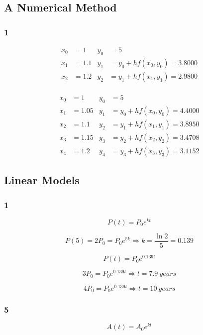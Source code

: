 \documentclass{article}
\begin{document}
\subsection{A Numerical Method}

\subsubsection{1}

\begin{align*}
  x_0 & = 1   & y_0 & = 5                            \\
  x_1 & = 1.1 & y_1 & = y_0 + h f(x_0, y_0) = 3.8000 \\
  x_2 & = 1.2 & y_2 & = y_1 + h f(x_1, y_1) = 2.9800 \\
\end{align*}

\begin{align*}
  x_0 & = 1    & y_0 & = 5                            \\
  x_1 & = 1.05 & y_1 & = y_0 + h f(x_0, y_0) = 4.4000 \\
  x_2 & = 1.1  & y_2 & = y_1 + h f(x_1, y_1) = 3.8950 \\
  x_3 & = 1.15 & y_3 & = y_2 + h f(x_2, y_2) = 3.4708 \\
  x_4 & = 1.2  & y_4 & = y_3 + h f(x_3, y_3) = 3.1152
\end{align*}

\subsection{Linear Models}

\subsubsection{1}

\[P(t) = P_0 e^{k t}\]

\[P(5) = 2 P_0 = P_0 e^{5 k} \Rightarrow k = \frac{\ln 2}{5} = 0.139\]

\[P(t) = P_0 e^{0.139 t}\]

\[3 P_0 = P_0 e^{0.139 t} \Rightarrow t = \qty{7.9}{years}\]

\[4 P_0 = P_0 e^{0.139 t} \Rightarrow t = \qty{10}{years}\]

\subsubsection{5}

\[A(t) = A_0 e^{k t}\]
\end{document}
